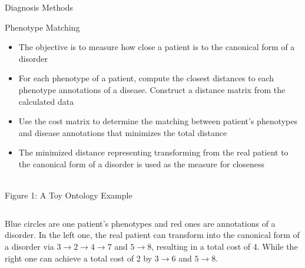 \documentclass[final]{beamer} %
\begin{document}
\begin{frame}{}
\begin{columns}[T]
\begin{column}{0.3\linewidth}
\begin{block}{\Huge Diagnosis Methods}
    \begin{block}{\Large Phenotype Matching}
     \begin{itemize}
     \Large
     \item
     The objective is to measure how close a patient is to the canonical form of a disorder
     \vspace{1cm}
     \item
     For each phenotype of a patient, compute the closest distances to each phenotype annotations of a disease. Construct a distance matrix from the calculated data
     \vspace{1cm}
    \item
    Use the cost matrix to determine the matching between patient's phenotypes and disease annotations that minimizes the total distance
     \vspace{1cm}
    \item
    The minimized distance representing transforming from the real patient to the canonical form of a disorder is used as the measure for closeness
         \end{itemize}
   \vspace{0.5cm}
   \begin{center}
   \\
   \normalsize
   Figure 1: A Toy Ontology Example
   \end{center}
   \begin{columns}[T]
   \begin{column}{.9\textwidth}
   \large
Blue circles are one patient's phenotypes and red ones are annotations of a disorder. In the left one, the real patient can transform into the canonical form of a disorder via $3 \rightarrow 2 \rightarrow 4 \rightarrow 7$ and $5 \rightarrow 8$, resulting in a total cost of 4. While the right one can achieve a total cost of 2 by $3 \rightarrow 6$ and $5 \rightarrow 8$.
   \end{column}
   \end{columns}
   
   \end{block}
  \end{block}


\end{column}
\end{columns}
\end{frame}
\end{document}
